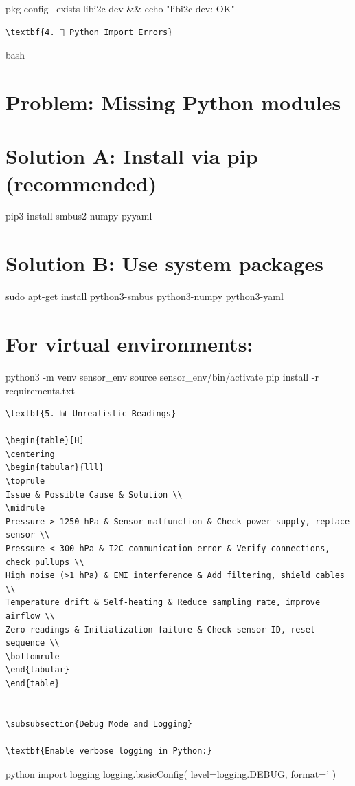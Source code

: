 \documentclass[11pt,a4paper]{article}
\begin{document}
pkg-config --exists libi2c-dev && echo "libi2c-dev: OK"
\begin{lstlisting}[language=text]
\textbf{4. 🐍 Python Import Errors}
\end{lstlisting}bash

\setcounter{section}{0}
\section{Problem: Missing Python modules}


\setcounter{section}{0}
\section{Solution A: Install via pip (recommended)}

pip3 install smbus2 numpy pyyaml


\setcounter{section}{0}
\section{Solution B: Use system packages}

sudo apt-get install python3-smbus python3-numpy python3-yaml


\setcounter{section}{0}
\section{For virtual environments:}

python3 -m venv sensor_env
source sensor_env/bin/activate
pip install -r requirements.txt
\begin{lstlisting}[language=text]
\textbf{5. 📊 Unrealistic Readings}

\begin{table}[H]
\centering
\begin{tabular}{lll}
\toprule
Issue & Possible Cause & Solution \\
\midrule
Pressure > 1250 hPa & Sensor malfunction & Check power supply, replace sensor \\
Pressure < 300 hPa & I2C communication error & Verify connections, check pullups \\
High noise (>1 hPa) & EMI interference & Add filtering, shield cables \\
Temperature drift & Self-heating & Reduce sampling rate, improve airflow \\
Zero readings & Initialization failure & Check sensor ID, reset sequence \\
\bottomrule
\end{tabular}
\end{table}


\subsubsection{Debug Mode and Logging}

\textbf{Enable verbose logging in Python:}
\end{lstlisting}python
import logging
logging.basicConfig(
    level=logging.DEBUG,
    format='%
)
\end{document}
